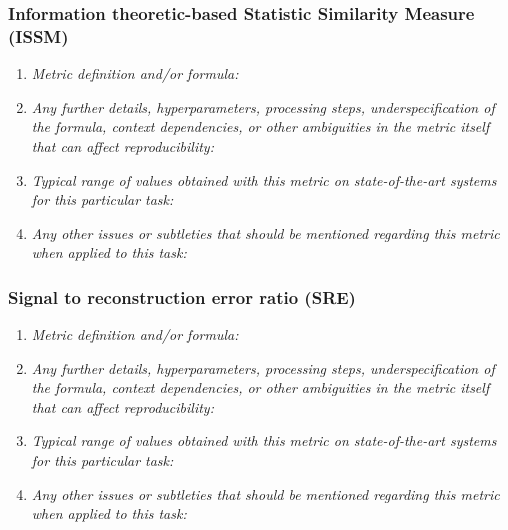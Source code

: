 \documentclass[a4paper,11pt]{article}
\begin{document}
        \subsubsection{Information theoretic-based Statistic Similarity Measure (ISSM)}
            \begin{enumerate}[label=\alph*.]
                \item \textit{Metric definition and/or formula:}
                \bigskip
                \item \textit{Any further details, hyperparameters, processing steps, underspecification of the formula, context dependencies, or other ambiguities in the metric itself that can affect reproducibility:}
                \bigskip
                \item \textit{Typical range of values obtained with this metric on state-of-the-art systems for this particular task:}
                \bigskip
                \item \textit{Any other issues or subtleties that should be mentioned regarding this metric when applied to this task:}
                \bigskip
            \end{enumerate}
        \subsubsection{Signal to reconstruction error ratio (SRE)}
            \begin{enumerate}[label=\alph*.]
                \item \textit{Metric definition and/or formula:}
                \bigskip
                \item \textit{Any further details, hyperparameters, processing steps, underspecification of the formula, context dependencies, or other ambiguities in the metric itself that can affect reproducibility:}
                \bigskip
                \item \textit{Typical range of values obtained with this metric on state-of-the-art systems for this particular task:}
                \bigskip
                \item \textit{Any other issues or subtleties that should be mentioned regarding this metric when applied to this task:}
                \bigskip
            \end{enumerate}
\end{document}
